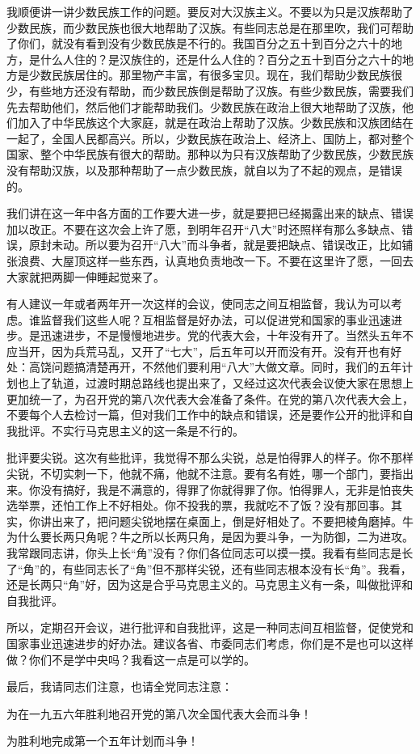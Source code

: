 我顺便讲一讲少数民族工作的问题。要反对大汉族主义。不要以为只是汉族帮助了少数民族，而少数民族也很大地帮助了汉族。有些同志总是在那里吹，我们可帮助了你们，就没有看到没有少数民族是不行的。我国百分之五十到百分之六十的地方，是什么人住的？是汉族住的，还是什么人住的？百分之五十到百分之六十的地方是少数民族居住的。那里物产丰富，有很多宝贝。现在，我们帮助少数民族很少，有些地方还没有帮助，而少数民族倒是帮助了汉族。有些少数民族，需要我们先去帮助他们，然后他们才能帮助我们。少数民族在政治上很大地帮助了汉族，他们加入了中华民族这个大家庭，就是在政治上帮助了汉族。少数民族和汉族团结在一起了，全国人民都高兴。所以，少数民族在政治上、经济上、国防上，都对整个国家、整个中华民族有很大的帮助。那种以为只有汉族帮助了少数民族，少数民族没有帮助汉族，以及那种帮助了一点少数民族，就自以为了不起的观点，是错误的。

我们讲在这一年中各方面的工作要大进一步，就是要把已经揭露出来的缺点、错误加以改正。不要在这次会上许了愿，到明年召开“八大”时还照样有那么多缺点、错误，原封未动。所以要为召开“八大”而斗争者，就是要把缺点、错误改正，比如铺张浪费、大屋顶这样一些东西，认真地负责地改一下。不要在这里许了愿，一回去大家就把两脚一伸睡起觉来了。

有人建议一年或者两年开一次这样的会议，使同志之间互相监督，我认为可以考虑。谁监督我们这些人呢？互相监督是好办法，可以促进党和国家的事业迅速进步。是迅速进步，不是慢慢地进步。党的代表大会，十年没有开了。当然头五年不应当开，因为兵荒马乱，又开了“七大”，后五年可以开而没有开。没有开也有好处：高饶问题搞清楚再开，不然他们要利用“八大”大做文章。同时，我们的五年计划也上了轨道，过渡时期总路线也提出来了，又经过这次代表会议使大家在思想上更加统一了，为召开党的第八次代表大会准备了条件。在党的第八次代表大会上，不要每个人去检讨一篇，但对我们工作中的缺点和错误，还是要作公开的批评和自我批评。不实行马克思主义的这一条是不行的。

批评要尖锐。这次有些批评，我觉得不那么尖锐，总是怕得罪人的样子。你不那样尖锐，不切实刺一下，他就不痛，他就不注意。要有名有姓，哪一个部门，要指出来。你没有搞好，我是不满意的，得罪了你就得罪了你。怕得罪人，无非是怕丧失选举票，还怕工作上不好相处。你不投我的票，我就吃不了饭？没有那回事。其实，你讲出来了，把问题尖锐地摆在桌面上，倒是好相处了。不要把棱角磨掉。牛为什么要长两只角呢？牛之所以长两只角，是因为要斗争，一为防御，二为进攻。我常跟同志讲，你头上长“角”没有？你们各位同志可以摸一摸。我看有些同志是长了“角”的，有些同志长了“角”但不那样尖锐，还有些同志根本没有长“角”。我看，还是长两只“角”好，因为这是合乎马克思主义的。马克思主义有一条，叫做批评和自我批评。

所以，定期召开会议，进行批评和自我批评，这是一种同志间互相监督，促使党和国家事业迅速进步的好办法。建议各省、市委同志们考虑，你们是不是也可以这样做？你们不是学中央吗？我看这一点是可以学的。

最后，我请同志们注意，也请全党同志注意：

为在一九五六年胜利地召开党的第八次全国代表大会而斗争！

为胜利地完成第一个五年计划而斗争！
